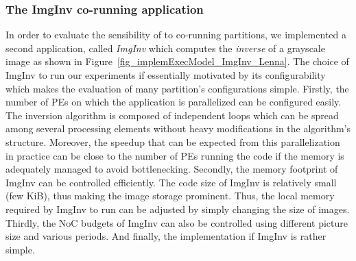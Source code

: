 \documentclass[main.tex]{subfiles}
\begin{document}
\subsubsection{The ImgInv co-running application} In order to evaluate the
sensibility of \rosace to co-running partitions, we implemented a second
application, called \emph{ImgInv} which computes the \emph{inverse} of a
grayscale image as shown in Figure~\ref{fig_implemExecModel_ImgInv_Lenna}. The
choice of ImgInv to run our experiments if essentially motivated by its
configurability which makes the evaluation of many partition's configurations
simple. Firstly, the number of PEs on which the application is parallelized can
be configured easily. The inversion algorithm is composed of independent loops
which can be spread among several processing elements without heavy
modifications in the algorithm's structure. Moreover, the speedup that can be
expected from this parallelization in practice can be close to the number of
PEs running the code if the memory is adequately managed to avoid
bottlenecking. Secondly, the memory footprint of ImgInv can be controlled
efficiently. The code size of ImgInv is relatively small (few KiB), thus making
the image storage prominent. Thus, the local memory required by ImgInv to run
can be adjusted by simply changing the size of images. Thirdly, the NoC budgets
of ImgInv can also be controlled using different picture size and various
periods. And finally, the implementation if ImgInv is rather simple. 
\end{document}

